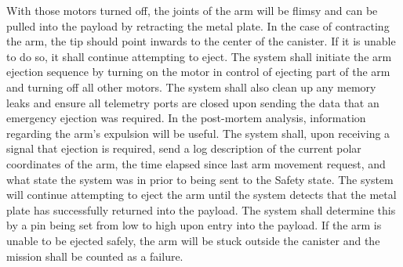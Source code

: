With those motors turned off, the joints of the arm will be flimsy and can be pulled into the payload by retracting the metal plate.
In the case of contracting the arm, the tip should point inwards to the center of the canister.
If it is unable to do so, it shall continue attempting to eject. 
The system shall initiate the arm ejection sequence by turning on the motor in control of ejecting part of the arm and turning off all
other motors. 
The system shall also clean up any memory leaks and ensure all telemetry ports are closed upon sending the data that an 
emergency ejection was required. In the post-mortem analysis, information regarding the arm's expulsion will be useful. The system
shall, upon receiving a signal that ejection is required, send a log description of the current polar coordinates of the arm, the time 
elapsed since last arm movement request, and what state the system was in prior to being sent to the Safety state. The system will 
continue attempting to eject the arm until the system detects that the metal plate has successfully returned into the payload. 
The system shall determine this by a pin being set from low to high upon entry into the payload. 
If the arm is unable to be ejected safely, the arm will be stuck outside the canister and the mission shall be counted
as a failure.


